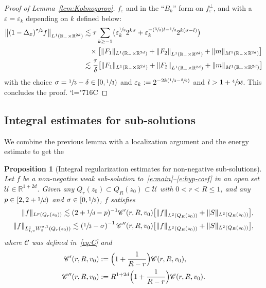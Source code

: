 \documentclass[JEP,XML,SOM,Unicode,NoFloatCountersInSection,published]{cedram}
\let\mathcal\mathscr
\newcommand{\Psfrac}[2]{(\sfrac{#1}{#2})}
\newcommand{\Changelback}{\mathcode`l="716C}
\newtheorem{proposition}[theorem]{Proposition}
\theoremstyle{definition}
\theoremstyle{remark}
\newcommand{\norm}[1]{\left\| #1 \right\|}
\newcommand\R{{\mathbb R}}
\newcommand{\cC}{\mathcal C}
\newcommand{\cU}{\mathcal{U}}
\let\var\varepsilon
\begin{document}
\begin{proof}[Proof of Lemma~\ref{lem:Kolmogorov}]
$f_\var$ and in the ``$B_k$'' form on $f_\var^\bot$, and with
a $\var=\var_k$ depending on $k$ defined below:
\begin{align*}
\bigl\| (1-\Delta_x)^{\sfrac{\sigma}{2}} f \bigr\|_{L^1(\R_-
\times \R^{2d})}
& \lesssim \tau \sum_{k \ge -1} \bigl( \var_k
^{\sfrac12} 2^{k\sigma} + \var_k^{-\Psfrac{3}{2}l -\sfrac12}
2^{k(\sigma-l)} \bigr) \\
&\hspace*{3mm}
\times \bigl[ \| F_1 \|_{L^1(\R_- \times \R^{2d})}
+ \left\| F_2 \right\|_{L^1(\R_- \times \R^{2d})}
+ \| m \|_{M^1(\R_- \times \R^{2d})} \bigr]\\
& \lesssim
\frac{\tau}{\delta} \bigl[ \| F_1 \|_{L^1(\R_- \times \R^{2d})}
+ \left\| F_2 \right\|_{L^1(\R_- \times \R^{2d})}
+ \| m \|_{M^1(\R_- \times \R^{2d})} \bigr]
\end{align*}
with the choice $\sigma = \sfrac13 - \delta \in [0,\sfrac13)$ and
$\var_k := 2^{-2k(\sfrac13-\sfrac{\delta}{2})}$ and
$l> 1+\sfrac{4}{9\delta}$. This concludes the proof.
\Changelback
\end{proof}

\subsection{Integral estimates for sub-solutions}

We combine the previous lemma with a localization argument and
the energy estimate to get the
\begin{proposition}[Integral regularization estimates for
non-negative sub-solutions]
\label{prop:Gain sol}
Let $f$ be a non-negative weak sub-solution
to~\eqref{e:main}--\eqref{e:hyp-coef} in an open set
$\cU \in \R^{1+2d}$. Given any
$Q_r(z_0) \subset Q_R(z_0) \subset \cU$ with $0<r<R \le 1$, and
any $p \in [2,2+\sfrac1d)$ and $\sigma \in [0,\sfrac13)$, $f$
satisfies
\begin{align}
\label{eq:gain-int}
\|f\|_{L^{p}(Q_r(z_0))} \lesssim ( 2+ \sfrac1d - p)^{-1}
\cC'(r,R,v_0) \bigl[ \norm{f}_{L^{2}(Q_R(z_0))}
+ \|S\|_{L^2(Q_R(z_0))} \bigr] ,\\
\label{eq:gain-reg}
\| f \|_{L^1_{t,v}W^{\sigma,1}_x(Q_r(z_0))} \lesssim \left(
\sfrac13 - \sigma \right)^{-1}
\cC''(r,R,v_0) \bigl[ \norm{f}_{L^{2}(Q_R(z_0))}
+ \|S\|_{L^2(Q_R(z_0))} \bigr],
\end{align}
where $\cC$ was defined in~\eqref{eq:C} and
\begin{align*}
\cC'(r,R,v_0) &:= \Bigl( 1+ \frac{1}{R-r} \Bigr)
\cC(r,R,v_0),\\
\cC''(r,R,v_0) &:= R^{1+2d} \Bigl( 1+ \frac{1}{R-r} \Bigr)
\cC(r,R,v_0).
\end{align*}
\end{proposition}
\end{document}

